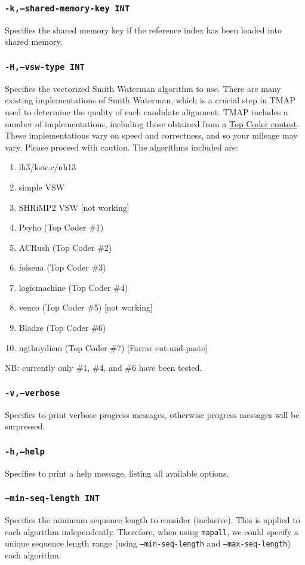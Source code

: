 \documentclass[a4paper,12pt]{book}
\newcommand{\TT}[1]{{\tt #1}} %
\begin{document}
\subsubsection{\TT{-k,--shared-memory-key INT}}
Specifies the shared memory key if the reference index has been loaded into shared memory.

\subsubsection{\TT{-H,--vsw-type INT}}
Specifies the vectorized Smith Waterman algorithm to use.
There are many existing implementations of Smith Waterman, which is a crucial step in TMAP used to determine the quality of each candidate alignment.
TMAP includes a number of implementations, including those obtained from a  \href{http://community.topcoder.com/longcontest/?module=ViewProblemStatement&rd=15078&pm=11786}{Top Coder contest}.
These implementations vary on speed and correctness, and so your mileage may vary.  
Please proceed with caution. 
The algorithms included are:
\begin{enumerate}
\item lh3/ksw.c/nh13
\item simple VSW
\item SHRiMP2 VSW [not working]
\item Psyho (Top Coder \#1)
\item ACRush (Top Coder \#2)
\item folsena (Top Coder \#3)
\item logicmachine (Top Coder \#4)
\item venco (Top Coder \#5) [not working]
\item Bladze (Top Coder \#6)
\item ngthuydiem (Top Coder \#7) [Farrar cut-and-paste]
\end{enumerate}
NB: currently only \#1, \#4, and \#6 have been tested.
\subsubsection{\TT{-v,--verbose}}
Specifies to print verbose progress messages, otherwise progress messages will be surpressed.

\subsubsection{\TT{-h,--help}}
Specifies to print a help message, listing all available options.

\subsubsection{\TT{--min-seq-length INT}}
Specifies the minimum sequence length to consider (inclusive).
This is applied to each algorithm independently.
Therefore, when using \TT{mapall}, we could specify a unique sequence length range (using \TT{---min-seq-length} and \TT{---max-seq-length}) each algorithm.
\end{document}
